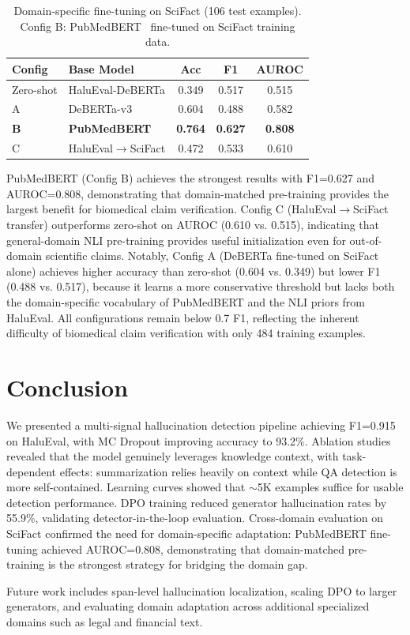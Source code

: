 \documentclass[11pt]{article}
\begin{document}
\begin{table}[h]
\centering
\small
\begin{tabular}{@{}llccc@{}}
\toprule
\textbf{Config} & \textbf{Base Model} & \textbf{Acc} & \textbf{F1} & \textbf{AUROC} \\
\midrule
Zero-shot & HaluEval-DeBERTa & 0.349 & 0.517 & 0.515 \\
A & DeBERTa-v3 & 0.604 & 0.488 & 0.582 \\
\textbf{B} & \textbf{PubMedBERT} & \textbf{0.764} & \textbf{0.627} & \textbf{0.808} \\
C & HaluEval$\rightarrow$SciFact & 0.472 & 0.533 & 0.610 \\
\bottomrule
\end{tabular}
\caption{Domain-specific fine-tuning on SciFact (106 test examples). Config B: PubMedBERT~\citep{gu2021domain} fine-tuned on SciFact training data.}
\label{tab:scifact}
\end{table}

PubMedBERT (Config B) achieves the strongest results with F1=0.627 and AUROC=0.808, demonstrating that domain-matched pre-training provides the largest benefit for biomedical claim verification. Config C (HaluEval$\rightarrow$SciFact transfer) outperforms zero-shot on AUROC (0.610 vs. 0.515), indicating that general-domain NLI pre-training provides useful initialization even for out-of-domain scientific claims. Notably, Config A (DeBERTa fine-tuned on SciFact alone) achieves higher accuracy than zero-shot (0.604 vs. 0.349) but lower F1 (0.488 vs. 0.517), because it learns a more conservative threshold but lacks both the domain-specific vocabulary of PubMedBERT and the NLI priors from HaluEval. All configurations remain below 0.7 F1, reflecting the inherent difficulty of biomedical claim verification with only 484 training examples.


\section{Conclusion}

We presented a multi-signal hallucination detection pipeline achieving F1=0.915 on HaluEval, with MC Dropout improving accuracy to 93.2\%. Ablation studies revealed that the model genuinely leverages knowledge context, with task-dependent effects: summarization relies heavily on context while QA detection is more self-contained. Learning curves showed that $\sim$5K examples suffice for usable detection performance. DPO training reduced generator hallucination rates by 55.9\%, validating detector-in-the-loop evaluation. Cross-domain evaluation on SciFact confirmed the need for domain-specific adaptation: PubMedBERT fine-tuning achieved AUROC=0.808, demonstrating that domain-matched pre-training is the strongest strategy for bridging the domain gap.

Future work includes span-level hallucination localization, scaling DPO to larger generators, and evaluating domain adaptation across additional specialized domains such as legal and financial text.


\end{document}

